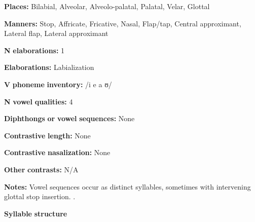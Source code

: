 \documentclass[output=paper]{langsci/langscibook}
\begin{document}
\begin{styleBody}
\textbf{Places:} Bilabial, Alveolar, Alveolo-palatal, Palatal, Velar, Glottal
\end{styleBody}

\begin{styleBody}
\textbf{Manners:} Stop, Affricate, Fricative, Nasal, Flap/tap, Central approximant, Lateral flap, Lateral approximant
\end{styleBody}

\begin{styleBody}
\textbf{N} \textbf{elaborations:} 1
\end{styleBody}

\begin{styleBody}
\textbf{Elaborations:} Labialization
\end{styleBody}

\begin{styleBody}
\textbf{V} \textbf{phoneme} \textbf{inventory:} /i e a ʊ/
\end{styleBody}

\begin{styleBody}
\textbf{N} \textbf{vowel} \textbf{qualities:} 4
\end{styleBody}

\begin{styleBody}
\textbf{Diphthongs} \textbf{or} \textbf{vowel} \textbf{sequences:} None
\end{styleBody}

\begin{styleBody}
\textbf{Contrastive} \textbf{length:} None
\end{styleBody}

\begin{styleBody}
\textbf{Contrastive} \textbf{nasalization:} None
\end{styleBody}

\begin{styleBody}
\textbf{Other} \textbf{contrasts:} N/A
\end{styleBody}

\begin{styleBody}
\textbf{Notes:} Vowel sequences occur as distinct syllables, sometimes with intervening glottal stop insertion. \citep[28-9]{Guillaume2008}.
\end{styleBody}

\begin{styleBody}
\textbf{Syllable} \textbf{structure}
\end{styleBody}
\end{document}
